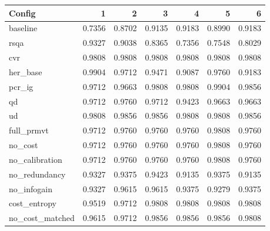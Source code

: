 \begin{tabular}{lrrrrrr}
\hline
Config & 1 & 2 & 3 & 4 & 5 & 6 \\
\hline
baseline & 0.7356 & 0.8702 & 0.9135 & 0.9183 & 0.8990 & 0.9183 \\
rsqa & 0.9327 & 0.9038 & 0.8365 & 0.7356 & 0.7548 & 0.8029 \\
cvr & 0.9808 & 0.9808 & 0.9808 & 0.9808 & 0.9808 & 0.9808 \\
her\_base & 0.9904 & 0.9712 & 0.9471 & 0.9087 & 0.9760 & 0.9183 \\
pcr\_ig & 0.9712 & 0.9663 & 0.9808 & 0.9808 & 0.9904 & 0.9856 \\
qd & 0.9712 & 0.9760 & 0.9712 & 0.9423 & 0.9663 & 0.9663 \\
ud & 0.9808 & 0.9856 & 0.9856 & 0.9808 & 0.9808 & 0.9856 \\
full\_prmvt & 0.9712 & 0.9760 & 0.9760 & 0.9760 & 0.9808 & 0.9760 \\
no\_cost & 0.9712 & 0.9760 & 0.9760 & 0.9760 & 0.9808 & 0.9760 \\
no\_calibration & 0.9712 & 0.9760 & 0.9760 & 0.9760 & 0.9808 & 0.9760 \\
no\_redundancy & 0.9327 & 0.9375 & 0.9423 & 0.9135 & 0.9375 & 0.9135 \\
no\_infogain & 0.9327 & 0.9615 & 0.9615 & 0.9375 & 0.9279 & 0.9375 \\
cost\_entropy & 0.9519 & 0.9712 & 0.9808 & 0.9808 & 0.9808 & 0.9808 \\
no\_cost\_matched & 0.9615 & 0.9712 & 0.9856 & 0.9856 & 0.9856 & 0.9808 \\
\hline
\end{tabular}
